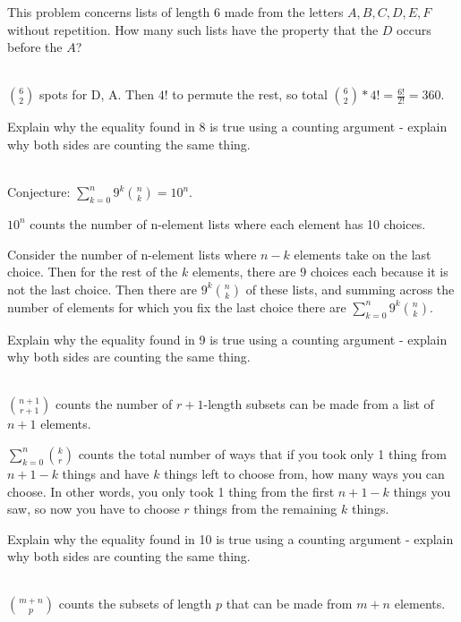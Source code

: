 \documentclass[12 pt]{exam}
\begin{document}
\begin{questions}
\begin{parts}
\end{parts}
\question This problem concerns lists of length 6 made from the letters $A,B,C,D,E,F$
without repetition. How many such lists have the property that the $D$ occurs
before the $A$?

\begin{solution}\\
    $\binom{6}{2}$ spots for D, A. Then $4!$ to permute the rest,
    so total $\binom{6}{2} * 4! = \frac{6!}{2!} = 360$.
\end{solution}


\question  Explain why the equality found in 8 is true using a counting argument - explain why both sides are counting the same thing.

\begin{solution}\\
Conjecture: $\sum_{k=0}^n 9^k \binom{n}{k} = 10^n$.

$10^n$ counts the number of n-element lists where each element has 10 choices.

Consider the number of n-element lists where $n-k$ elements take on the last choice.
Then for the rest of the $k$ elements, there are $9$ choices each because it is not the last choice.
Then there are $9^k \binom{n}{k}$ of these lists, and summing across the number of elements for which you
fix the last choice there are $\sum_{k=0}^n 9^k \binom{n}{k}$. \end{solution}


\question  Explain why the equality found in 9 is true using a counting argument - explain why both sides are counting the same thing.  

\begin{solution}\\
$\binom{n+1}{r+1}$ counts the number of $r+1$-length subsets can be made from a list of $n+1$ elements.

$\sum_{k=0}^n \binom{k}{r}$ counts the total number of ways that if you took only 1 thing from $n+1-k$ things
and have $k$ things left to choose from, how many ways you can choose. In other words, you only took 1 thing
from the first $n+1-k$ things you saw, so now you have to choose $r$ things from the remaining $k$ things.
\end{solution}


\question  Explain why the equality found in 10 is true using a counting argument - explain why both sides are counting the same thing. 

\begin{solution}\\
$\binom{m+n}{p}$ counts the subsets of length $p$ that can be made from $m+n$ elements.


\end{solution}
\end{questions}
\end{document}
